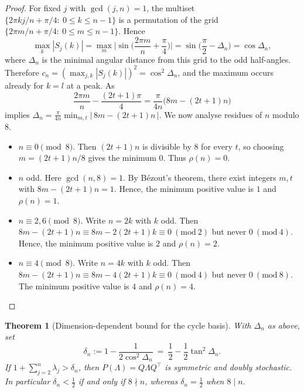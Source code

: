 \documentclass[12pt,fleqn]{amsart}
\renewcommand{\le}{\leqslant}
\newtheorem{thm}{Theorem}
\theoremstyle{remark}
\newcommand{\1}{\mathbf{1}}
\newcommand{\Lam}{\Lambda}
\begin{document}
\begin{proof}
For fixed $j$ with $\gcd(j,n)=1$, the multiset $\{2\pi kj/n+\pi/4:\ 0\le k\le n-1\}$ is a permutation of the grid $\{2\pi m/n+\pi/4:\ 0\le m\le n-1\}$. Hence
\[
\max_k|S_j(k)|=\max_m\Big|\sin\Big(\frac{2\pi m}{n}+\frac{\pi}{4}\Big)\Big|
=\sin\!\Big(\frac{\pi}{2}-\Delta_n\Big)=\cos\Delta_n,
\]
where $\Delta_n$ is the minimal angular distance from this grid to the odd half-angles. Therefore $c_n=(\max_{j,k}|S_j(k)|)^2=\cos^2\Delta_n$, and the maximum occurs already for $k=l$ at a peak. As
\[
\frac{2\pi m}{n}-\frac{(2t+1)\pi}{4}=\frac{\pi}{4n}\big(8m-(2t+1)n\big)
\]
implies $\Delta_n=\tfrac{\pi}{4n}\min_{m,t}|\,8m-(2t+1)n\,|$. We now analyse residues of $n$ modulo $8$.
\begin{itemize}
\item {$n\equiv0\pmod 8$.}
Then $(2t+1)n$ is divisible by $8$ for every $t$, so choosing $m=(2t+1)n/8$ gives the minimum $0$. Thus $\rho(n)=0$.

\item {$n$ odd.}
Here $\gcd(n,8)=1$. By Bézout's theorem, there exist integers $m,t$ with $8m-(2t+1)n=1$. Hence, the minimum positive value is $1$ and $\rho(n)=1$.

\item {$n\equiv 2,6\pmod 8$.}
Write $n=2k$ with $k$ odd. Then $8m-(2t+1)n\equiv 8m-2(2t+1)k\equiv 0\ (\mathrm{mod}\ 2)$ but never $0\ (\mathrm{mod}\ 4)$. Hence, the minimum positive value is $2$ and $\rho(n)=2$.

\item {$n\equiv4\pmod 8$.}
Write $n=4k$ with $k$ odd. Then $8m-(2t+1)n\equiv 8m-4(2t+1)k\equiv 0\ (\mathrm{mod}\ 4)$ but never $0\ (\mathrm{mod}\ 8)$. The minimum positive value is $4$ and $\rho(n)=4$.
\end{itemize}
\end{proof}

\begin{thm}[Dimension-dependent bound for the cycle basis]\label{thm:cycle}
With $\Delta_n$ as above, set
\[
\delta_n:=1-\frac{1}{2\cos^2\Delta_n}
\ =\ \frac12-\frac12\tan^2\Delta_n.
\]
If $1+\sum_{j=2}^n\lambda_j>\delta_n$, then $P(\Lam)=Q\Lam Q^\top$ is symmetric and doubly stochastic. In particular $\delta_n<\tfrac12$ if and only if $8\nmid n$, whereas $\delta_n=\tfrac12$ when $8\mid n$.
\end{thm}
\end{document}
